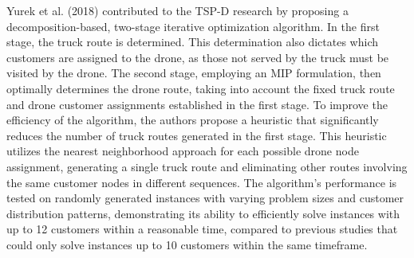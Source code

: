 \documentclass{article}
\begin{document}
	Yurek et al. (2018) contributed to the TSP-D research by proposing a decomposition-based, two-stage iterative optimization algorithm. In the first stage, the truck route is determined. This determination also dictates which customers are assigned to the drone, as those not served by the truck must be visited by the drone. The second stage, employing an MIP formulation, then optimally determines the drone route, taking into account the fixed truck route and drone customer assignments established in the first stage. To improve the efficiency of the algorithm, the authors propose a heuristic that significantly reduces the number of truck routes generated in the first stage. This heuristic utilizes the nearest neighborhood approach for each possible drone node assignment, generating a single truck route and eliminating other routes involving the same customer nodes in different sequences. The algorithm’s performance is tested on randomly generated instances with varying problem sizes and customer distribution patterns, demonstrating its ability to efficiently solve instances with up to 12 customers within a reasonable time, compared to previous studies that could only solve instances up to 10 customers within the same timeframe.
	
\end{document}
